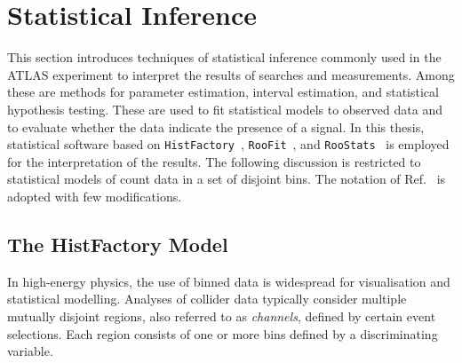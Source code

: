\section{Statistical Inference}%
\label{sec:statistical_inference}

This section introduces techniques of statistical inference commonly used in the
ATLAS experiment to interpret the results of searches and measurements. Among
these are methods for parameter estimation, interval estimation, and statistical
hypothesis testing. These are used to fit statistical models to observed data
and to evaluate whether the data indicate the presence of a signal. In this
thesis, statistical software based on \texttt{HistFactory}~\cite{cranmer2012},
\texttt{RooFit}~\cite{Verkerke:2003ir}, and
\texttt{RooStats}~\cite{Moneta:2010pm} is employed for the interpretation of the
results. The following discussion is restricted to statistical models of count
data in a set of disjoint bins. The notation of Ref.~\cite{cranmer2012} is
adopted with few modifications.





\subsection{The HistFactory Model}

In high-energy physics, the use of binned data is widespread for visualisation
and statistical modelling. Analyses of collider data typically consider multiple
mutually disjoint regions, also referred to as \emph{channels}, defined by
certain event selections. Each region consists of one or more bins defined by a
discriminating variable.


